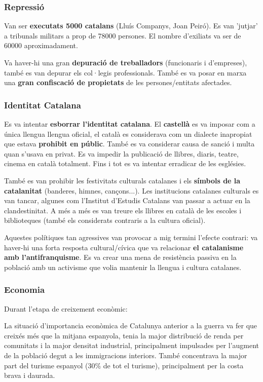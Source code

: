 \documentclass[arial,a4paper,print]{article}
\begin{document}
\subsubsection{Repressió}
Van ser \textbf{executats 5000 catalans} (Lluís Companys, Joan Peiró). Es van 'jutjar' a tribunals militars a prop de 78000 persones. El nombre d'exiliats va ser de 60000 aproximadament. 

Va haver-hi una gran \textbf{depuració de treballadors} (funcionaris i d'empreses), també es van depurar els col·legis professionals. També es va posar en marxa una \textbf{gran confiscació de propietats} de les persones/entitats afectades. 

\subsubsection{Identitat Catalana}
Es va intentar \textbf{esborrar l'identitat catalana}. El \textbf{castellà} es va imposar com a única llengua llengua oficial, el català es considerava com un dialecte inapropiat que estava \textbf{prohibit en públic}. També es va considerar causa de sanció i multa quan s'usava en privat. Es va impedir la publicació de llibres, diaris, teatre, cinema en català totalment. Fins i tot es va intentar erradicar de les esglésies. 

També es van prohibir les festivitats culturals catalanes i els \textbf{símbols de la catalanitat} (banderes, himnes, cançons...). Les institucions catalanes culturals es van tancar, algunes com l'Institut d'Estudis Catalans van passar a actuar en la clandestinitat. A més a més es van treure els llibres en català de les escoles i biblioteques (també els considerats contraris a la cultura oficial). 

Aquestes polítiques tan agressives van provocar a mig termini l'efecte contrari: va haver-hi una forta resposta cultural/cívica que va relacionar \textbf{el catalanisme amb l'antifranquisme}. Es va crear una mena de resistència passiva en la població amb un activisme que volia mantenir la llengua i cultura catalanes.  
 
\subsubsection{Economia}
Durant l'etapa de creixement econòmic: 

La situació d'importancia econòmica de Catalunya anterior a la guerra va fer que creixés més que la mitjana espanyola, tenia la major distribució de renda per comunitats i la major densitat industrial, principalment impulsades per l'augment de la població degut a les immigracions interiors. També concentrava la major part del turisme espanyol (30\% de tot el turisme), principalment per la costa brava i daurada. 
\end{document}
